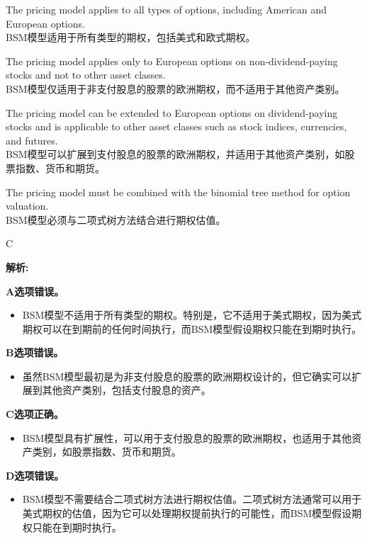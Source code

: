 \documentclass{article}
\newenvironment{explanation}
{\textbf{解析:}\par}
{\par}
\begin{document}
\begin{choices}
\item The pricing model applies to all types of options, including American and European options.\\
BSM模型适用于所有类型的期权，包括美式和欧式期权。
\item The pricing model applies only to European options on non-dividend-paying stocks and not to other asset classes.\\
BSM模型仅适用于非支付股息的股票的欧洲期权，而不适用于其他资产类别。
\item The pricing model can be extended to European options on dividend-paying stocks and is applicable to other asset classes such as stock indices, currencies, and futures.\\
BSM模型可以扩展到支付股息的股票的欧洲期权，并适用于其他资产类别，如股票指数、货币和期货。
\item The pricing model must be combined with the binomial tree method for option valuation.\\
BSM模型必须与二项式树方法结合进行期权估值。
\end{choices}

\begin{correctanswer}
C
\end{correctanswer}

\begin{explanation}
 
    
    \textbf{A选项错误。}
    \begin{itemize}
    \item BSM模型不适用于所有类型的期权。特别是，它不适用于美式期权，因为美式期权可以在到期前的任何时间执行，而BSM模型假设期权只能在到期时执行。
    \end{itemize}
    
    \textbf{B选项错误。}
    \begin{itemize}
    \item 虽然BSM模型最初是为非支付股息的股票的欧洲期权设计的，但它确实可以扩展到其他资产类别，包括支付股息的资产。
    \end{itemize}
    
    \textbf{C选项正确。}
    \begin{itemize}
    \item BSM模型具有扩展性，可以用于支付股息的股票的欧洲期权，也适用于其他资产类别，如股票指数、货币和期货。
    \end{itemize}

    \textbf{D选项错误。}
    \begin{itemize}
    \item BSM模型不需要结合二项式树方法进行期权估值。二项式树方法通常可以用于美式期权的估值，因为它可以处理期权提前执行的可能性，而BSM模型假设期权只能在到期时执行。
    \end{itemize}
    \end{explanation}
\end{document}

